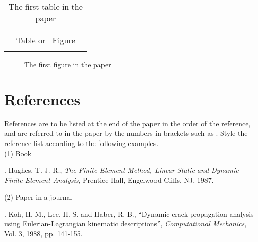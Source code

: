 \documentclass[12pt]{ksiamproc}
\begin{document}
	\begin{table}[ht]
		\caption{The first table in the paper}
		\begin{tabular}{|ccc|}\hline
			&&\\
			\phantom{MMMMMMMMMMMMMMMM}& Table or~ Figure&\phantom{MMMMMMMMMMMMMMMM}\\
			&&\\ \hline
		\end{tabular}
	\end{table}
	
	\begin{figure}[ht]
		\caption{\label{fig:fig1} The first figure in the paper}
	\end{figure}
	\section*{References}\noindent%
	References are to be listed at the end of the paper in the order
	of the reference, and are referred to in the paper by the numbers
	in brackets such as \cite{hugh,KLH}.  Style the reference list
	according to the following examples.
	\\
	
	\noindent (1) Book
	
	.  Hughes, T. J. R., {\it The Finite Element Method,
		Linear Static and Dynamic Finite Element  Analysis},
	Prentice-Hall, Engelwood Cliffs, NJ, 1987.
	
	\bigskip
	
	\noindent (2) Paper in a journal
	
	.  Koh, H. M., Lee, H. S. and Haber, R. B., ``Dynamic
	crack propagation analysis using Eulerian-Lagrangian kinematic
	descriptions'', {\it Computational Mechanics}, Vol. 3, 1988, pp.
	141-155.
	
\end{document}

